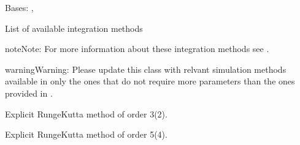 \documentclass[a4paper,landscape,10pt,english]{sphinxmanual}
\begin{document}
\begin{fulllineitems}
\label{\detokenize{code_docs/simulation_api.controller:simulation_api.controller.schemas.IntegrationMethods}}
Bases: , 

List of available integration methods

\begin{sphinxadmonition}{note}{Note:}
For more information about these integration methods see
.
\end{sphinxadmonition}

\begin{sphinxadmonition}{warning}{Warning:}
Please update this class with relvant simulation methods available in
 \textendash{}only the ones that do not require more
parameters than the ones provided in
{\hyperref[\detokenize{code_docs/simulation_api.controller:simulation_api.controller.schemas.SimRequest}]{}}.
\end{sphinxadmonition}

\begin{fulllineitems}
\label{\detokenize{code_docs/simulation_api.controller:simulation_api.controller.schemas.IntegrationMethods.RK23}}
Explicit Runge\sphinxhyphen{}Kutta method of order 3(2).

\end{fulllineitems}


\begin{fulllineitems}
\label{\detokenize{code_docs/simulation_api.controller:simulation_api.controller.schemas.IntegrationMethods.RK45}}
Explicit Runge\sphinxhyphen{}Kutta method of order 5(4).

\end{fulllineitems}


\end{fulllineitems}
\end{document}
